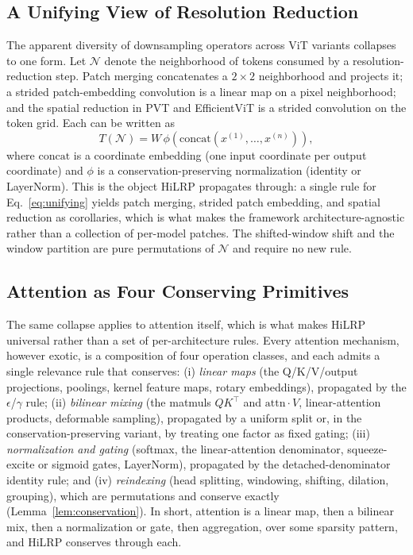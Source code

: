 \documentclass[lettersize,journal]{IEEEtran}
\begin{document}
\subsection{A Unifying View of Resolution Reduction}
\label{sec:unifying}
The apparent diversity of downsampling operators across ViT variants collapses to one form. Let $\mathcal{N}$ denote the neighborhood of tokens consumed by a resolution-reduction step. Patch merging concatenates a $2{\times}2$ neighborhood and projects it; a strided patch-embedding convolution is a linear map on a pixel neighborhood; and the spatial reduction in PVT and EfficientViT is a strided convolution on the token grid. Each can be written as
\begin{equation}
\label{eq:unifying}
T(\mathcal{N}) = W\,\phi\!\left(\mathrm{concat}(x^{(1)},\dots,x^{(n)})\right),
\end{equation}
where $\mathrm{concat}$ is a coordinate embedding (one input coordinate per output coordinate) and $\phi$ is a conservation-preserving normalization (identity or LayerNorm). This is the object HiLRP propagates through: a single rule for Eq.~\eqref{eq:unifying} yields patch merging, strided patch embedding, and spatial reduction as corollaries, which is what makes the framework architecture-agnostic rather than a collection of per-model patches. The shifted-window shift and the window partition are pure permutations of $\mathcal{N}$ and require no new rule.

\subsection{Attention as Four Conserving Primitives}
\label{sec:primitives}
The same collapse applies to attention itself, which is what makes HiLRP universal rather than a set of per-architecture rules. Every attention mechanism, however exotic, is a composition of four operation classes, and each admits a single relevance rule that conserves: (i) \emph{linear maps} (the Q/K/V/output projections, poolings, kernel feature maps, rotary embeddings), propagated by the $\epsilon$/$\gamma$ rule; (ii) \emph{bilinear mixing} (the matmuls $QK^\top$ and $\mathrm{attn}{\cdot}V$, linear-attention products, deformable sampling), propagated by a uniform split or, in the conservation-preserving variant, by treating one factor as fixed gating; (iii) \emph{normalization and gating} (softmax, the linear-attention denominator, squeeze-excite or sigmoid gates, LayerNorm), propagated by the detached-denominator identity rule; and (iv) \emph{reindexing} (head splitting, windowing, shifting, dilation, grouping), which are permutations and conserve exactly (Lemma~\ref{lem:conservation}). In short, attention is a linear map, then a bilinear mix, then a normalization or gate, then aggregation, over some sparsity pattern, and HiLRP conserves through each.
\end{document}

